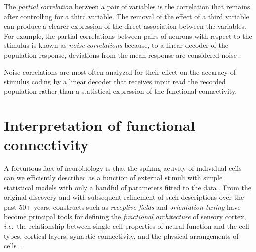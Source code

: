 The \emph{partial correlation} between a pair of variables is the correlation that remains after controlling for a third variable. The removal of the effect of a third variable can produce a clearer expression of the direct association between the variables.
For example, the partial correlations between pairs of neurons with respect to the stimulus is known as \emph{noise correlations} because, to a linear decoder of the population response, deviations from the mean response are considered noise \citep{Zohary:1994}. 

Noise correlations are most often analyzed for their effect on the accuracy of stimulus coding by a linear decoder that receives input read the recorded population \citep{Averbeck:2006,Ecker:2011} rather than a statistical expression of the functional connectivity. 



\section{Interpretation of functional connectivity}
A fortuitous fact of neurobiology is that the spiking activity of individual cells can we efficiently described as a function of external stimuli with simple statistical models with only a handful of parameters fitted to the data \citep{Carandini:2005}. From the original discovery and with subsequent refinement of such descriptions over the past 50+ years, constructs such as \emph{receptive fields} and \emph{orientation tuning} have become principal tools for defining the \emph{functional architecture} of sensory cortex, \emph{i.e.}\ the relationship between single-cell properties of neural function and the cell types, cortical layers, synaptic connectivity, and the physical arrangements of cells  \citep{Hubel:1962,Ohki:2005,Reid:2012}.
